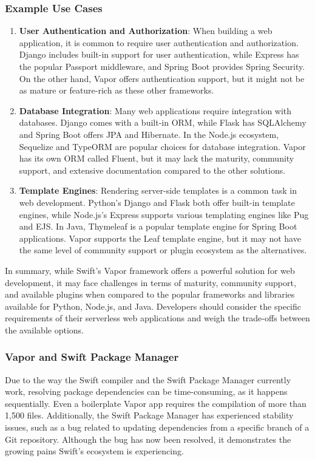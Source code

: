\subsubsection{Example Use Cases}

\begin{enumerate}
    \item \textbf{User Authentication and Authorization}: When building a web application, it is common to require user authentication and authorization. Django includes built-in support for user authentication, while Express has the popular Passport middleware, and Spring Boot provides Spring Security. On the other hand, Vapor offers authentication support, but it might not be as mature or feature-rich as these other frameworks.
    \item \textbf{Database Integration}: Many web applications require integration with databases. Django comes with a built-in ORM, while Flask has SQLAlchemy and Spring Boot offers JPA and Hibernate. In the Node.js ecosystem, Sequelize and TypeORM are popular choices for database integration. Vapor has its own ORM called Fluent, but it may lack the maturity, community support, and extensive documentation compared to the other solutions.
    \item \textbf{Template Engines}: Rendering server-side templates is a common task in web development. Python's Django and Flask both offer built-in template engines, while Node.js's Express supports various templating engines like Pug and EJS. In Java, Thymeleaf is a popular template engine for Spring Boot applications. Vapor supports the Leaf template engine, but it may not have the same level of community support or plugin ecosystem as the alternatives.
\end{enumerate}

In summary, while Swift's Vapor framework offers a powerful solution for web development, it may face challenges in terms of maturity, community support, and available plugins when compared to the popular frameworks and libraries available for Python, Node.js, and Java. Developers should consider the specific requirements of their serverless web applications and weigh the trade-offs between the available options.

\subsubsection{Vapor and Swift Package Manager}

Due to the way the Swift compiler and the Swift Package Manager currently work, resolving package dependencies can be time-consuming, as it happens sequentially. Even a boilerplate Vapor app requires the compilation of more than 1,500 files. Additionally, the Swift Package Manager has experienced stability issues, such as a bug related to updating dependencies from a specific branch of a Git repository. Although the bug has now been resolved, it demonstrates the growing pains Swift's ecosystem is experiencing.    


